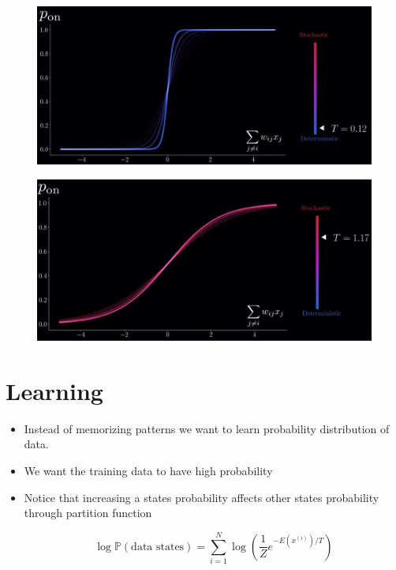 \documentclass{antclass}
\begin{document}
\begin{figure}[H]
	\centering
	\begin{minipage}[b]{0.5\linewidth}
		\centering
		\includegraphics[width=\linewidth]{pics/BM/temp-low.jpg}

		\label{fig:temp-low}
	\end{minipage}
	
	\begin{minipage}[b]{0.5\linewidth}
		\centering
		\includegraphics[width=\linewidth]{pics/BM/temp-high.jpg}
		
		\label{fig:temp-high}
	\end{minipage}
	
	\label{fig:both}
\end{figure}

\section{Learning}

\begin{itemize}
	\item Instead of memorizing patterns we want to learn probability distribution of data.
	\item We want the training data to have high probability
	\item Notice that increasing a states probability affects other states probability through partition function
	
		\[ \log \mathbb{P}(\text{data states}) = \sum_{i=1}^{N} \log(\frac{1}{Z} e^{-E(x^{(i)})/T}) \]
\end{itemize}
\pagebreak
\end{document}
